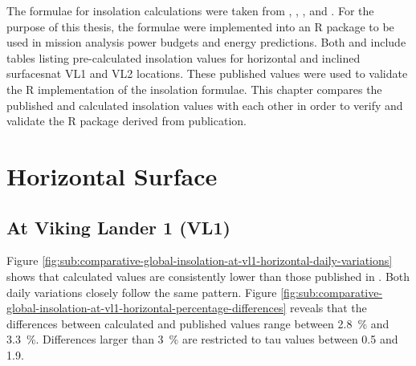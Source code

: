The formulae for insolation calculations were taken from , , , and . For the purpose of this thesis, the formulae were implemented into an R package to be used in mission analysis power budgets and energy predictions. Both  and  include tables listing pre-calculated insolation values for horizontal and inclined surfacesnat \ac{VL1} and \ac{VL2} locations. These published values were used to validate the R implementation of the insolation formulae. This chapter compares the published and calculated insolation values with each other in order to verify and validate the R package derived from publication.


\section{Horizontal Surface}
\subsection{At Viking Lander 1 (VL1)}
Figure \ref{fig:sub:comparative-global-insolation-at-vl1-horizontal-daily-variations} shows that calculated values are consistently lower than those published in . Both daily variations closely follow the same pattern. Figure \ref{fig:sub:comparative-global-insolation-at-vl1-horizontal-percentage-differences} reveals that the differences between calculated and published values range between \SI{2.8}{\percent} and \SI{3.3}{\percent}. Differences larger than \SI{3}{\percent} are restricted to tau values between 0.5 and 1.9.

